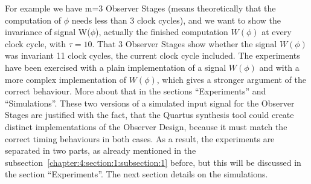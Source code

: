 For example we have m=3 Observer Stages (means theoretically that the computation of $\phi$ needs less than 3 clock cycles), 
and we want to show the invariance of signal W($\phi$), actually the finished computation $W(\phi)$ at every clock cycle, with $\tau = 10$. 
That 3 Observer Stages show whether the signal $W(\phi)$ was invariant 11 clock cycles, the current clock cycle included.
The experiments have been exercised with a plain implementation of a signal $W(\phi)$ and with a more complex implementation of $W(\phi)$, which gives a stronger argument of the correct behaviour.
More about that in the sections ``Experiments'' and ``Simulations''.
These two versions of a simulated input signal for the Observer Stages are justified with the fact, 
that the Quartus synthesis tool could create distinct implementations of the Observer Design, because it must match the correct timing behaviours in both cases.   
As a result, the experiments are separated in two parts, as already mentioned in the subsection~\ref{chapter:4:section:1:subsection:1} before, 
but this will be discussed in the section ``Experiments''.   
The next section details on the simulations.
%


%



